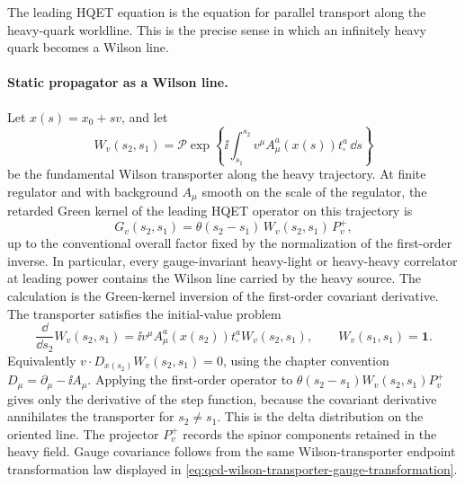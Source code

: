 The leading HQET equation is the equation for parallel transport along the
heavy-quark worldline.  This is the precise sense in which an infinitely heavy
quark becomes a Wilson line.

\paragraph{Static propagator as a Wilson line.}
Let \(x(s)=x_0+sv\), and let
\begin{equation}
  W_v(s_2,s_1)=\mathcal P\exp\left\{
    \ii\int_{s_1}^{s_2}v^\mu A_\mu^a(x(s))t_\square^a\,\dd s
  \right\}
  \label{eq:hqet-worldline-wilson-line}
\end{equation}
be the fundamental Wilson transporter along the heavy trajectory.  At finite
regulator and with background \(A_\mu\) smooth on the scale of the regulator,
the retarded Green kernel of the leading HQET operator on this trajectory is
\begin{equation}
  G_v(s_2,s_1)=\theta(s_2-s_1)\,W_v(s_2,s_1)\,P_v^+ ,
  \label{eq:hqet-static-green-kernel}
\end{equation}
up to the conventional overall factor fixed by the normalization of the
first-order inverse.  In particular, every gauge-invariant heavy-light or
heavy-heavy correlator at leading power contains the Wilson line carried by
the heavy source.
The calculation is the Green-kernel inversion of the first-order covariant
derivative.  The transporter satisfies the initial-value problem
\[
  \frac{\dd}{\dd s_2}W_v(s_2,s_1)
  =
  \ii v^\mu A_\mu^a(x(s_2))t_\square^a W_v(s_2,s_1),
  \qquad W_v(s_1,s_1)=\mathbf 1 .
\]
Equivalently \(v\cdot D_{x(s_2)}W_v(s_2,s_1)=0\), using the chapter
convention \(D_\mu=\partial_\mu-\ii A_\mu\).  Applying the first-order operator
to \(\theta(s_2-s_1)W_v(s_2,s_1)P_v^+\) gives only the derivative of the step
function, because the covariant derivative annihilates the transporter for
\(s_2\ne s_1\).  This is the delta distribution on the oriented line.  The
projector \(P_v^+\) records the spinor components retained in the heavy field.
Gauge covariance follows from the same Wilson-transporter endpoint
transformation law displayed in
\eqref{eq:qcd-wilson-transporter-gauge-transformation}.

